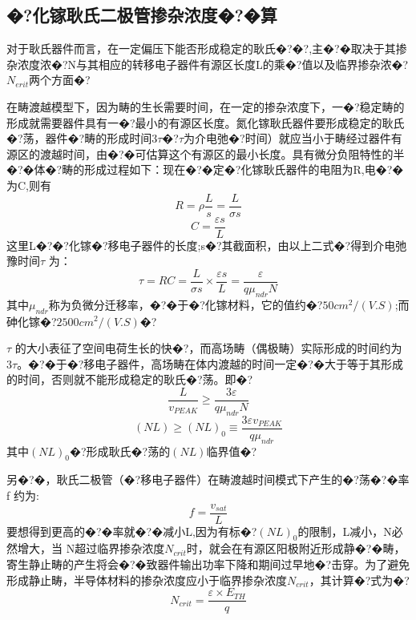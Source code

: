 \documentclass{zjureport}
\begin{document}
\subsection{�?化镓耿氏二极管掺杂浓度�?�算}
对于耿氏器件而言，在一定偏压下能否形成稳定的耿氏�?�?,主�?�取决于其掺杂浓度浓�?N与其相应的转移电子器件有源区长度L的乘�?值以及临界掺杂浓�?$N_{erit}$两个方面�?

在畴渡越模型下，因为畴的生长需要时间，在一定的掺杂浓度下，一�?稳定畴的形成就需要器件具有一�?最小的有源区长度。氮化镓耿氏器件要形成稳定的耿氏�?荡，器件�?畴的形成时间3$ \tau $�?$\tau$为介电弛�?时间）就应当小于畴经过器件有源区的渡越时间，由�?�可估算这个有源区的最小长度。具有微分负阻特性的半�?�体�?畴的形成过程如下：现在�?�定�?化镓耿氏器件的电阻为R,电�?�为C,则有
\begin{equation}
	R=\rho \frac{L}{s}=\frac{L}{\sigma s}
\end{equation}
\begin{equation}
	C=\frac{\varepsilon s}{L}
\end{equation}
这里L�?�?化镓�?移电子器件的长度;s�?其截面积，由以上二式�?得到介电弛豫时间$\tau$ 为：
\begin{equation}
	\tau = RC=\frac{L}{\sigma s}×\frac{\varepsilon s}{L}=\frac{\varepsilon}{q\mu_{ndr}N}
\end{equation}
其中$ \mu_{ndr}$称为负微分迁移率，�?�于�?化镓材料，它的值约�?$50cm^{2}/(V.S)$;而砷化镓�?$2500cm^{2}/(V.S)$�?

$\tau$ 的大小表征了空间电荷生长的快�?，而高场畴（偶极畴）实际形成的时间约为$3\tau $。�?�于�?移电子器件，高场畴在体内渡越的时间一定�?�大于等于其形成的时间，否则就不能形成稳定的耿氏�?荡。即�?
\begin{equation}
	\frac{L}{v_{PEAK}}\geq \frac{3\varepsilon}{q\mu_{ndr}N}
\end{equation}
\begin{equation}
	(NL)\geq(NL)_{0}\equiv\frac{3\varepsilon v_{PEAK}}{q\mu_{ndr}}
\end{equation}
其中$(NL)_{0}$�?形成耿氏�?荡的$(NL)$临界值�?

另�?�，耿氏二极管（�?移电子器件）在畴渡越时间模式下产生的�?荡�?�率 f 约为:
\begin{equation}
		f=\frac{v_{sat}}{L}
\end{equation}
要想得到更高的�?�率就�?�减小L,因为有标�?$(NL)_{0}$的限制，L减小，N必然增大，当 N超过临界掺杂浓度$N_{crit}$时，就会在有源区阳极附近形成静�?�畴，寄生静止畴的产生将会�?�致器件输出功率下降和期间过早地�?击穿。为了避免形成静止畴，半导体材料的掺杂浓度应小于临界掺杂浓度$N_{crit}$，其计算�?式为�?
\begin{equation}
	N_{crit}=\frac{\varepsilon ×E_{TH}}{q}
\end{equation}
\end{document}
